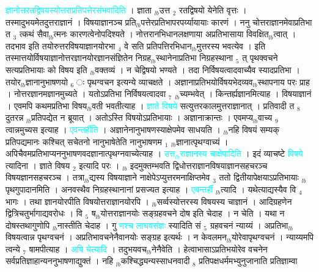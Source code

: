 \documentclass[article,12pt,a4paper]{memoir}%
\newcommand{\quotelemma}[1]{\textcolor{cyan}{#1}}
\begin{document}
\quotelemma{ज्ञानोत्तरतद्विषयस्योत्तराप्रतिपत्तेरसंभवादिति} । ज्ञाता {\tiny $_{lb}$}उत्त {\tiny $_{2}$} रतद्विषयो येनेति वृत्तः । तस्मादुभयमेतदुत्तराज्ञानं । विषयाज्ञानञ्च प्रति{\tiny $_{lb}$}पत्तेरप्रतिभापरपर्य्यायायाः कारणं । ननु चोत्तराज्ञानमेवाप्रतिभा त {\tiny $_{3}$} त्कथं सैवा{\tiny $_{lb}$}त्मनः कारणत्वेनोपदिश्यते । नोत्तरानभिधानलक्षणाया अप्रतिभासाया विवक्षित{\tiny $_{lb}$}त्वात् । तदभाव इति तयोरुत्तरविषयाज्ञानयोरभा {\tiny $_{4}$} वे सति प्रतिपत्तिरभिधान{\tiny $_{lb}$}मुत्तरस्य भवत्येव । इति तस्मात्तयोर्विषयाज्ञानोत्तरज्ञानयोरज्ञानसंज्ञितेन निग्रह{\tiny $_{lb}$}स्थानेनाप्रतिभा निग्रहस्थाना {\tiny $_{5}$} त् पृथक्वचने सत्यप्रतिभायाः को विषय इति {\tiny $_{lb}$}वक्तव्यं । न चेद्विषयो भण्यते । तदा निर्विषयत्वादवाच्यैव स्यादप्रतिभा । तयोर{\tiny $_{lb}$}ज्ञानानुभाषणयो {\tiny $_{6}$} ः पृथग्वचन इत्यन्ये व्याचक्षते । अज्ञानाप्रतिभयोर्विषयभेदव्यव{\tiny $_{lb}$}स्थापनाय परः प्राह । नोत्तरज्ञानमज्ञानमुच्यते । यतोऽप्रतिभा निर्विषयत्वादवा {\tiny $_{7}$} {\tiny $_{lb}$}च्यम्भवेत् । किन्तर्ह्यज्ञानमित्याह । विषयाज्ञानं । एवमपि कथमप्रतिभा विषय{\tiny $_{lb}$}वती भवतीत्याह । \quotelemma{ज्ञाते विषये} सत्युत्तरकालमुत्तराज्ञानात् । प्रतिवादी त {\tiny $_{8}$} दुतरन्न {\tiny $_{lb}$}प्रतिपद्येत न ब्रूयात् । अतोऽस्ति विषयोऽप्रतिभायाः । अज्ञानाक्रान्तः । एवमप्य{\tiny $_{lb}$}वाच्य {\tiny $_{9}$} \leavevmode{} त्वान्नमुच्यस इत्याह । \quotelemma{एवन्तर्हीति} । अज्ञानेनानुभाषणस्याक्षेपमेव साधयति । {\tiny $_{lb}$}नहि विषयं सम्यक् प्रतिपद्यमानः कश्चित् सचेतनो नानुभाषेतेति नानुभाषणम {\tiny $_{1}$} {\tiny $_{lb}$}ज्ञानात्पृथग्वाच्यं । अपिचैवमप्रतिभाप्यननुभाषणवदज्ञानात्पृथग्नवाच्येत्याह । \quotelemma{उत्त{\tiny $_{lb}$}राज्ञानस्य चाक्षेपादिति} । इदं व्याचष्टे \quotelemma{विषये} त्यादिना । ज्ञाते विषय {\tiny $_{2}$} इत्यादि परः । {\tiny $_{lb}$}  \leavevmode{} इदमुक्तम्भवति द्विधोत्तराज्ञानविषयाज्ञानसहचरञ्च विषयज्ञानसहचरञ्च । तत्रा{\tiny $_{lb}$}द्यस्य विषयाज्ञाने नाक्षेपेऽप्युत्तरमनाक्षिप्तमेव {\tiny $_{3}$} ततो द्वितीयापेक्षयाऽप्रतिभायाः {\tiny $_{lb}$}पृथगुपादानमिति । अनवस्थैव निग्रहस्थानानां प्रसज्यत इत्याह । \quotelemma{एवन्तर्ही} {\tiny $_{lb}$}त्यादि । यथेत्याद्यस्यैव वि {\tiny $_{4}$} भागः । तथा ज्ञानयोरपीति विषयोत्तराज्ञानयोरपि । {\tiny $_{lb}$}सर्व्वस्योत्तरस्य विषयस्य चाज्ञानं । आदिग्रहणेन द्वित्रिचतुर्भागाद्यवरोधः । वि {\tiny $_{5}$} ष{\tiny $_{lb}$}योत्तराज्ञानयोः सङ्ग्रहवचने दोष इति चेदाह । न चेति । यथा न दोषस्तथागुणोपि {\tiny $_{lb}$}नास्तीति चेदाह । गु \quotelemma{णश्च लाघवसंज्ञः} स्यादिति सं {\tiny $_{5}$} ग्रहवचनं न्याय्यं । अप्रतिभा{\tiny $_{lb}$}विषयत्वान्न पृथग्वचनं । अप्रतिभावचनेनैवानयोः सङ्ग्रह इत्यर्थः । न केवलमन{\tiny $_{lb}$}योरेवापृथग्वचनं । न्याय्यमपि त्वन्ये {\tiny $_{7}$} षामपीत्याह । \quotelemma{अपि चेत्यादि} । तदुभयवच{\tiny $_{lb}$}नेनैवेति । हेत्वाभासाऽप्रतिभयोरेव वचनेन सर्वप्रतिज्ञाहान्यननुभाषणाद्युक्तं । नहि {\tiny $_{lb}$}कश्चिद्ध्यन्यस्साधनवादी {\tiny $_{8}$} प्रतिपक्षधर्ममभ्युनुजानाति प्रतिज्ञाम्वा 
\end{document}

